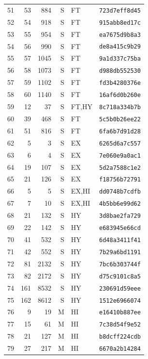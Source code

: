 \begin{longtable}{rrrrll}
51 & 53 & 884 & S & FT & \texttt{723d7eff8d45} \\
52 & 54 & 918 & S & FT & \texttt{915abb8ed17c} \\
53 & 55 & 954 & S & FT & \texttt{ea7675d9b8a3} \\
54 & 56 & 990 & S & FT & \texttt{de8a415c9b29} \\
55 & 57 & 1045 & S & FT & \texttt{9a1d337c75ba} \\
56 & 58 & 1073 & S & FT & \texttt{d988db552530} \\
57 & 59 & 1102 & S & FT & \texttt{fd3b4280376e} \\
58 & 60 & 1140 & S & FT & \texttt{16af6d0b260e} \\
59 & 12 & 37 & S & FT,HY & \texttt{8c718a334b7b} \\
60 & 39 & 468 & S & FT & \texttt{5c5b0b26ee22} \\
61 & 51 & 816 & S & FT & \texttt{6fa6b7d91d28} \\
62 & 5 & 3 & S & EX & \texttt{6265d6a7c557} \\
63 & 6 & 4 & S & EX & \texttt{7e060e9a0ac1} \\
64 & 19 & 107 & S & EX & \texttt{5d2a7588c1e2} \\
65 & 21 & 126 & S & EX & \texttt{f18756b72791} \\
66 & 5 & 5 & S & EX,HI & \texttt{dd0748b7cdfb} \\
67 & 7 & 10 & S & EX,HI & \texttt{4b5bb6e99d62} \\
68 & 21 & 132 & S & HY & \texttt{3d8bae2fa729} \\
69 & 22 & 142 & S & HY & \texttt{e683945e66cd} \\
70 & 41 & 532 & S & HY & \texttt{6d48a3411f41} \\
71 & 42 & 552 & S & HY & \texttt{7b29a6bd1191} \\
72 & 81 & 2132 & S & HY & \texttt{7bc6b303744f} \\
73 & 82 & 2172 & S & HY & \texttt{d75c9101c8a5} \\
74 & 161 & 8532 & S & HY & \texttt{230691d59eee} \\
75 & 162 & 8612 & S & HY & \texttt{1512e6966074} \\
76 & 9 & 19 & M & HI & \texttt{e16410b887ee} \\
77 & 15 & 61 & M & HI & \texttt{7c38d54f9e52} \\
78 & 21 & 127 & M & HI & \texttt{b8dcff224cdb} \\
79 & 27 & 217 & M & HI & \texttt{6670a2b14284} \\

\end{longtable}

